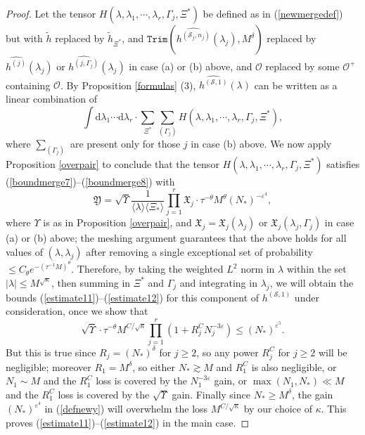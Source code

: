 \documentclass[11 pt,reqno]{amsart}
\theoremstyle{definition}
\theoremstyle{remark}
\numberwithin{equation}{section}
\newcommand{\Sc}{\mathcal{S}}
\newcommand{\Xf}{\mathfrak{X}}
\newcommand{\Yf}{\mathfrak{Y}}
\newcommand{\Os}{\mathscr{O}}
\begin{document}
{\begin{proof}
Let the tensor $H(\lambda,\lambda_1,\cdots,\lambda_r,\Gamma_j,\Xi^*)$ be defined as in (\ref{newmergedef}) but with $\widetilde{h}$ replaced by $\widetilde{h}_{\Xi^*}$, and $\mathtt{Trim}(\widehat{h^{(\Sc_j,n_j)}}(\lambda_j),M^\delta)$ replaced by $\widehat{h^{(j)}}(\lambda_j)$ or $\widehat{h^{(j,\Gamma_j)}}(\lambda_j)$ in case (a) or (b) above, and $\Os$ replaced by some $\Os^+$ containing $\Os$. By Proposition \ref{formulas} (3), $\widehat{h^{(\Sc,1)}}(\lambda)$ can be written as a linear combination of
\[\int\mathrm{d}\lambda_1\cdots\mathrm{d}\lambda_r\cdot\sum_{\Xi^*}\sum_{(\Gamma_j)}H(\lambda,\lambda_1,\cdots,\lambda_r,\Gamma_j,\Xi^*),\] where $\sum_{(\Gamma_j)}$ are present only for those $j$ in case (b) above. We now apply Proposition \ref{overpair} to conclude that the tensor $H(\lambda,\lambda_1,\cdots,\lambda_r,\Gamma_j,\Xi^*)$ satisfies (\ref{boundmerge7})--(\ref{boundmerge8}) with 
\begin{equation}\label{defnewy}\Yf=\sqrt{\Upsilon}\frac{1}{\langle\lambda\rangle\langle\Xi_*\rangle}\prod_{j=1}^r\Xf_j\cdot\tau^{-\theta}M^{\theta}(N_*)^{-\varepsilon^4},\end{equation} where $\Upsilon$ is as in Proposition \ref{overpair}, and $\Xf_j=\Xf_j(\lambda_j)$ or $\Xf_j(\lambda_j,\Gamma_j)$ in case (a) or (b) above; the meshing argument guarantees that the above holds for all values of $(\lambda,\lambda_j)$ after removing a single exceptional set of probability $\leq C_\theta e^{-(\tau^{-1}M)^\theta}$. Therefore, by taking the weighted $L^2$ norm in $\lambda$ within the set $|\lambda|\leq M^{\sqrt{\kappa}}$, then summing in $\Xi^*$ and $\Gamma_j$ and integrating in $\lambda_j$, we will obtain the bounds (\ref{estimate11})--(\ref{estimate12}) for this component of $h^{(\Sc,1)}$ under consideration, once we show that
\begin{equation}\label{auxterm}\sqrt{\Upsilon}\cdot\tau^{-\theta}M^{C/\sqrt{\kappa}}\prod_{j=1}^r(1+R_j^C N_j^{-3\varepsilon})\leq (N_*)^{\varepsilon^5}.\end{equation} But this is true since $R_j=(N_*)^{\delta}$ for $j\geq 2$, so any power $R_j^C$ for $j\geq 2$ will be negligible; moreover $R_1=M^\delta$, so either $N_*\gtrsim M$ and $R_1^C$ is also negligible, or $N_1\sim M$ and the $R_1^C$ loss is covered by the $N_1^{-3\varepsilon}$ gain, or $\max(N_1,N_*)\ll M$ and the $R_1^C$ loss is covered by the $\sqrt{\Upsilon}$ gain. Finally since $N_*\geq M^\delta$, the gain $(N_*)^{\varepsilon^4}$ in (\ref{defnewy}) will overwhelm the loss $M^{C/\sqrt{\kappa}}$ by our choice of $\kappa$. This proves (\ref{estimate11})--(\ref{estimate12}) in the main case.


\end{proof}}
\end{document}
